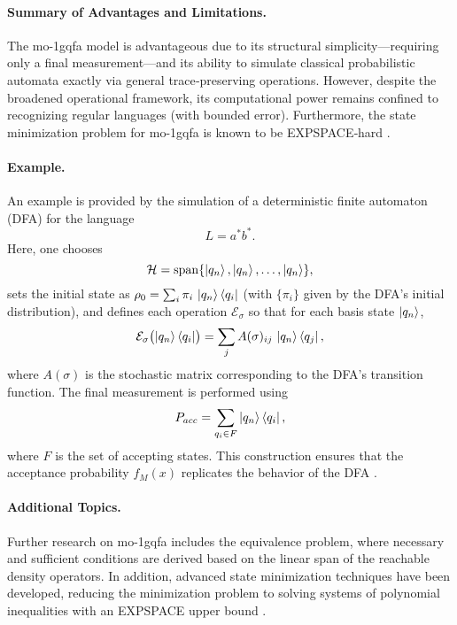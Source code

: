 \paragraph{Summary of Advantages and Limitations.}  
The \gls{mo-1gqfa} model is advantageous due to its structural simplicity—requiring only a final measurement—and its ability to simulate classical probabilistic automata exactly via general trace‐preserving operations. However, despite the broadened operational framework, its computational power remains confined to recognizing regular languages (with bounded error). Furthermore, the state minimization problem for \gls{mo-1gqfa} is known to be EXPSPACE‐hard \cite{mateus2012complexity}.

\paragraph{Example.}  
An example is provided by the simulation of a deterministic finite automaton (DFA) for the language
\[
L=a^*b^*.
\]
Here, one chooses 
\[
\mathcal{H}=\mathrm{span}\{\ket{q_n},\ket{q_n},\dots,\ket{q_n}\},
\]
sets the initial state as $\rho_0=\sum_{i}\pi_i\,\ket{q_n}\bra{q_i}$ (with $\{\pi_i\}$ given by the DFA’s initial distribution), and defines each operation $\mathcal{E}_\sigma$ so that for each basis state $\ket{q_n}$,
\[
\mathcal{E}_\sigma\bigl(\ket{q_n}\bra{q_i}\bigr)=\sum_{j}A(\sigma)_{ij}\,\ket{q_n}\bra{q_j},
\]
where $A(\sigma)$ is the stochastic matrix corresponding to the DFA's transition function. The final measurement is performed using 
\[
P_{acc}=\sum_{q_i\in F}\ket{q_n}\bra{q_i},
\]
where $F$ is the set of accepting states. This construction ensures that the acceptance probability $f_M(x)$ replicates the behavior of the DFA \cite{li2012characterizations}.

\paragraph{Additional Topics.}  
Further research on \gls{mo-1gqfa} includes the equivalence problem, where necessary and sufficient conditions are derived based on the linear span of the reachable density operators. In addition, advanced state minimization techniques have been developed, reducing the minimization problem to solving systems of polynomial inequalities with an EXPSPACE upper bound \cite{mercer2008lower}.

\subsubsection{}
